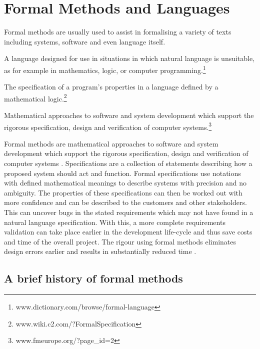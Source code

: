 \section{Formal Methods and Languages}
\label{sec:formalmethodsandformallanguages}

Formal methods are usually used to assist in formalising a variety of texts
including systems, software and even language itself.

\begin{defin} A language designed for use in situations in
which natural language is unsuitable, as for example in mathematics, logic, or
computer programming.\footnote{www.dictionary.com/browse/formal-language}
\end{defin}

\begin{defin} The specification of a program's properties
in a language defined by a mathematical
logic.\footnote{www.wiki.c2.com/?FormalSpecification}
\end{defin}

\begin{defin} Mathematical approaches to software and system
development which support the rigorous specification, design and verification of
computer systems.\footnote{www.fmeurope.org/?page\_id=2}
\end{defin}

Formal methods are mathematical approaches to software and system development
which support the rigorous specification, design and verification of computer
systems \cite{fmeurope}. Specifications are a collection of statements
describing how a proposed system should act and function. Formal specifications
use notations with defined mathematical meanings to describe systems with
precision and no ambiguity. The properties of these specifications can then be
worked out with more confidence and can be described to the customers and other
stakeholders. This can uncover bugs in the stated requirements which may not
have found in a natural language specification. With this, a more complete
requirements validation can take place earlier in the development life-cycle and
thus save costs and time of the overall project. The rigour using formal methods
eliminates design errors earlier and results in substantially reduced time
\cite{benefitsofform}. 

\subsection{A brief history of formal methods}

